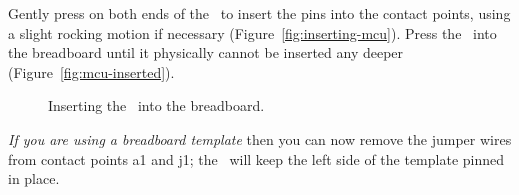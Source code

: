     Gently press on both ends of the \developmentboard\ to insert the pins into the contact points, using a slight rocking motion if necessary (Figure~\ref{fig:inserting-mcu}).
    Press the \developmentboard\ into the breadboard until it physically cannot be inserted any deeper (Figure~\ref{fig:mcu-inserted}).

\begin{figure}
    \centering
    \hfil
    \caption{Inserting the \developmentboard\ into the breadboard.}
\end{figure}


\textit{If you are using a breadboard template} then you can now remove the jumper wires from contact points a1 and j1;
the \developmentboard\ will keep the left side of the template pinned in place.
